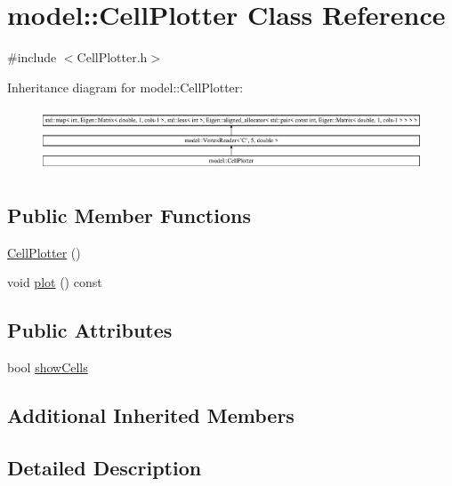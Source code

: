\hypertarget{classmodel_1_1_cell_plotter}{}\section{model\+:\+:Cell\+Plotter Class Reference}
\label{classmodel_1_1_cell_plotter}


{\ttfamily \#include $<$Cell\+Plotter.\+h$>$}

Inheritance diagram for model\+:\+:Cell\+Plotter\+:\begin{figure}[H]
\begin{center}
\leavevmode
\includegraphics[height=1.891892cm]{classmodel_1_1_cell_plotter}
\end{center}
\end{figure}
\subsection*{Public Member Functions}
\begin{DoxyCompactItemize}
\item 
\hyperlink{classmodel_1_1_cell_plotter_aa55570aa75dab6d91aadb50c0a376f6f}{Cell\+Plotter} ()
\item 
void \hyperlink{classmodel_1_1_cell_plotter_a403cf5519162303b1a279010e41d846d}{plot} () const 
\end{DoxyCompactItemize}
\subsection*{Public Attributes}
\begin{DoxyCompactItemize}
\item 
bool \hyperlink{classmodel_1_1_cell_plotter_a24a673e5fc567058b76d79b6c0b5e5f0}{show\+Cells}
\end{DoxyCompactItemize}
\subsection*{Additional Inherited Members}


\subsection{Detailed Description}


